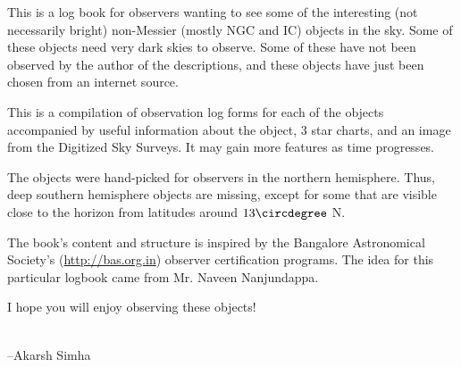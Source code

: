 This is a log book for observers wanting to see some of the
interesting (not necessarily bright) non-Messier (mostly NGC and IC)
objects in the sky. Some of these objects need very dark skies to
observe. Some of these have not been observed by the author of the
descriptions, and these objects have just been chosen from an internet
source.

This is a compilation of observation log forms for each of the objects
accompanied by useful information about the object, 3 star charts, and
an image from the Digitized Sky Surveys. It may gain more features as
time progresses.

The objects were hand-picked for observers in the northern
hemisphere. Thus, deep southern hemisphere objects are missing, except
for some that are visible close to the horizon from latitudes around
$13\circdegree$ N.

The book's content and structure is inspired by the Bangalore
Astronomical Society's (\url{http://bas.org.in}) observer
certification programs. The idea for this particular logbook came from
Mr. Naveen Nanjundappa.

I hope you will enjoy observing these objects!

\\

\hfill --Akarsh Simha
